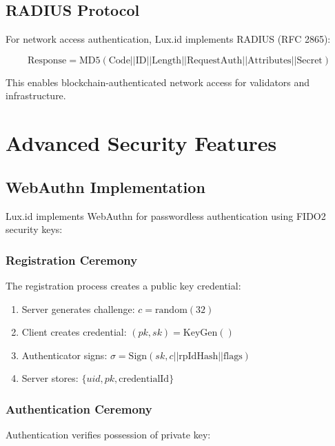 \documentclass[11pt,a4paper]{article}
\begin{document}
\subsection{RADIUS Protocol}

For network access authentication, Lux.id implements RADIUS (RFC 2865):

\begin{equation}
    \text{Response} = \text{MD5}(\text{Code} || \text{ID} || \text{Length} || \text{RequestAuth} || \text{Attributes} || \text{Secret})
\end{equation}

This enables blockchain-authenticated network access for validators and infrastructure.

\section{Advanced Security Features}

\subsection{WebAuthn Implementation}

Lux.id implements WebAuthn for passwordless authentication using FIDO2 security keys:

\subsubsection{Registration Ceremony}

The registration process creates a public key credential:

\begin{enumerate}
    \item Server generates challenge: $c = \text{random}(32)$
    \item Client creates credential: $(pk, sk) = \text{KeyGen}()$
    \item Authenticator signs: $\sigma = \text{Sign}(sk, c || \text{rpIdHash} || \text{flags})$
    \item Server stores: $\{uid, pk, \text{credentialId}\}$
\end{enumerate}

\subsubsection{Authentication Ceremony}

Authentication verifies possession of private key:
\end{document}
